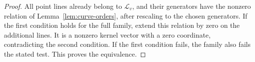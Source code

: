 \begin{proof}
All point lines already belong to \(\mathcal L_v\), and their
generators have the nonzero relation of
Lemma~\ref{lem:curve-orders}, after rescaling to the chosen
generators. If the first condition holds for the full family,
extend this relation by zero on the additional lines. It is a
nonzero kernel vector with a zero coordinate, contradicting the
second condition. If the first condition fails, the family also
fails the stated test. This proves the equivalence.
\end{proof}
